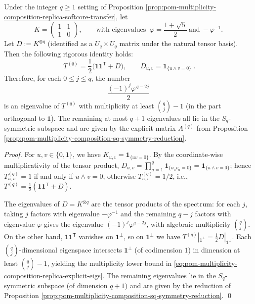 \begin{proposition}\label{prop:pom-multiplicity-composition-replica-explicit-eigs}
Under the integer \(q\ge 1\) setting of Proposition \ref{prop:pom-multiplicity-composition-replica-softcore-transfer},
let
\[
K=\begin{pmatrix}1&1\\[2pt]1&0\end{pmatrix},
\qquad
\text{with eigenvalues }\ \varphi=\frac{1+\sqrt5}{2}\ \text{and}\ -\varphi^{-1}.
\]
Let \(D:=K^{\otimes q}\) (identified as a \(U_q\times U_q\) matrix under the natural tensor basis). Then the following rigorous identity holds:
\[
\boxed{\;
T^{(q)}=\frac12\bigl(\mathbf{1}\mathbf{1}^{\mathsf T}+D\bigr),\qquad
D_{u,v}=\mathbf{1}_{\{u\wedge v=0\}}\; } .
\]
Therefore, for each \(0\le j\le q\), the number
\begin{equation}\label{eq:pom-multiplicity-composition-replica-explicit-eigs}
\boxed{\;
\frac{(-1)^j\varphi^{\,q-2j}}{2}\;}
\end{equation}
is an eigenvalue of \(T^{(q)}\) with multiplicity at least \(\binom{q}{j}-1\) (in the part orthogonal to \(\mathbf{1}\)).
The remaining at most \(q+1\) eigenvalues all lie in the \(S_q\)-symmetric subspace and are given by the explicit matrix \(A^{(q)}\) from Proposition \ref{prop:pom-multiplicity-composition-sq-symmetry-reduction}.
\end{proposition}
\begin{proof}
For \(u,v\in\{0,1\}\), we have
\(
K_{u,v}=\mathbf{1}_{\{uv=0\}}
\).
By the coordinate-wise multiplicativity of the tensor product,
\(
D_{u,v}=\prod_{a=1}^q \mathbf{1}_{\{u_av_a=0\}}=\mathbf{1}_{\{u\wedge v=0\}}
\);
hence
\(
T^{(q)}_{u,v}=1\) if and only if \(u\wedge v=0\), otherwise \(T^{(q)}_{u,v}=1/2\), i.e., \(T^{(q)}=\frac12(\mathbf{1}\mathbf{1}^{\mathsf T}+D)\).
\par
The eigenvalues of \(D=K^{\otimes q}\) are the tensor products of the spectrum:
for each \(j\), taking \(j\) factors with eigenvalue \(-\varphi^{-1}\) and the remaining \(q-j\) factors with eigenvalue \(\varphi\) gives the eigenvalue \((-1)^j\varphi^{q-2j}\), with algebraic multiplicity \(\binom{q}{j}\).
On the other hand, \(\mathbf{1}\mathbf{1}^{\mathsf T}\) vanishes on \(\mathbf{1}^\perp\), so on \(\mathbf{1}^\perp\) we have \(T^{(q)}|_{\mathbf{1}^\perp}=\frac12 D|_{\mathbf{1}^\perp}\).
Each \(\binom{q}{j}\)-dimensional eigenspace intersects \(\mathbf{1}^\perp\) (of codimension \(1\)) in dimension at least \(\binom{q}{j}-1\), yielding the multiplicity lower bound in \eqref{eq:pom-multiplicity-composition-replica-explicit-eigs}.
The remaining eigenvalues lie in the \(S_q\)-symmetric subspace (of dimension \(q+1\)) and are given by the reduction of Proposition \ref{prop:pom-multiplicity-composition-sq-symmetry-reduction}. \qed
\end{proof}


